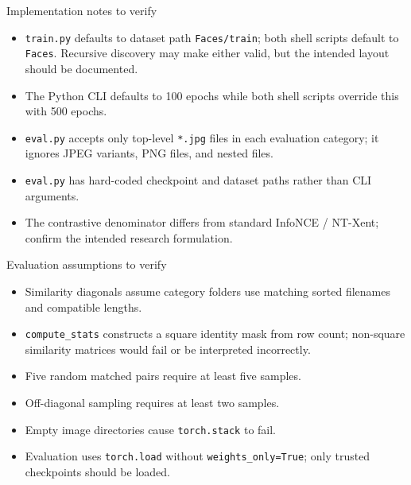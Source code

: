\documentclass[aspectratio=169,10pt]{beamer}
\newcommand{\file}[1]{\texttt{#1}}
\newcommand{\code}[1]{\texttt{#1}}
\begin{document}
\begin{frame}{Implementation notes to verify}
  \begin{itemize}
    \item \file{train.py} defaults to dataset path \file{Faces/train}; both shell
          scripts default to \file{Faces}. Recursive discovery may make either
          valid, but the intended layout should be documented.
    \item The Python CLI defaults to 100 epochs while both shell scripts override
          this with 500 epochs.
    \item \file{eval.py} accepts only top-level \file{*.jpg} files in each
          evaluation category; it ignores JPEG variants, PNG files, and nested files.
    \item \file{eval.py} has hard-coded checkpoint and dataset paths rather than CLI arguments.
    \item The contrastive denominator differs from standard InfoNCE / NT-Xent;
          confirm the intended research formulation.
  \end{itemize}
\end{frame}

\begin{frame}{Evaluation assumptions to verify}
  \begin{itemize}
    \item Similarity diagonals assume category folders use matching sorted filenames
          and compatible lengths.
    \item \code{compute\_stats} constructs a square identity mask from row count;
          non-square similarity matrices would fail or be interpreted incorrectly.
    \item Five random matched pairs require at least five samples.
    \item Off-diagonal sampling requires at least two samples.
    \item Empty image directories cause \code{torch.stack} to fail.
    \item Evaluation uses \code{torch.load} without \code{weights\_only=True};
          only trusted checkpoints should be loaded.
  \end{itemize}
\end{frame}
\end{document}
